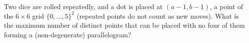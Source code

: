 Two dice are rolled repeatedly, and a dot is placed at $(a-1,b-1)$, a point of the $6\times6$ grid $\{0,\dots,5\}^2$ (repeated points do not count as new moves). What is the maximum number of distinct points that can be placed with no four of them forming a (non-degenerate) parallelogram?
